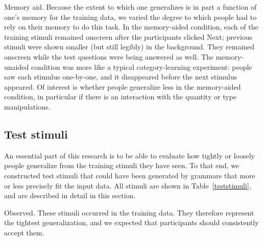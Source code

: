 \documentclass[10pt,letterpaper]{article}
\begin{document}
{\sc Memory aid}. Because the extent to which one generalizes is in part a function of one's memory for the training data, we varied the degree to which people had to rely on their memory to do this task. In the {\sc memory-aided} condition, each of the training stimuli remained onscreen after the participants clicked \textsf{Next}; previous stimuli were shown smaller (but still legibly) in the background. They remained onscreen while the test questions were being answered as well. The {\sc memory-unaided} condition was more like a typical category-learning experiment: people saw each stimulus one-by-one, and it disappeared before the next stimulus appeared. Of interest is whether people generalize less in the {\sc memory-aided} condition, in particular if there is an interaction with the {\sc quantity} or {\sc type} manipulations.




\subsection{Test stimuli}

An essential part of this research is to be able to evaluate how tightly or loosely people generalize from the training stimuli they have seen. To that end, we constructed test stimuli that could have been generated by grammars that more or less precisely fit the input data. All stimuli are shown in Table~\ref{teststimuli}, and are described in detail in this section.

\textsf{Observed}. These stimuli occurred in the training data. They therefore represent the tightest generalization, and we expected that participants should consistently accept them. %
\end{document}
